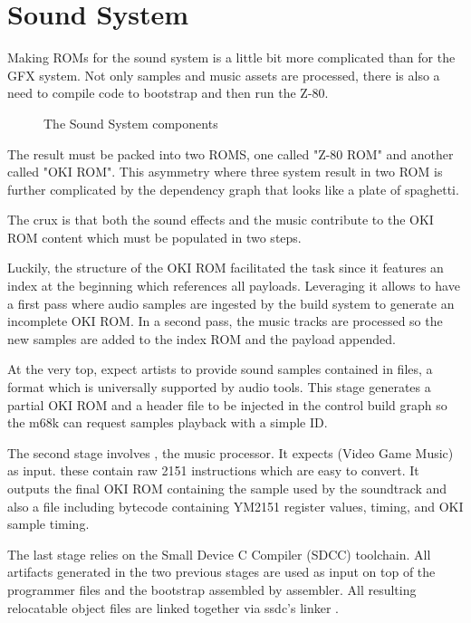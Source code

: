 \chapter{Sound System}
Making ROMs for the sound system is a little bit more complicated than for the GFX system. Not only samples and music assets are processed, there is also a need to compile code to bootstrap and then run the Z-80. 

\begin{figure}[H]
\caption*{The Sound System components}
\end{figure}

The result must be packed into two ROMS, one called "Z-80 ROM" and another called "OKI ROM". This asymmetry where three system result in two ROM is further complicated by the dependency graph that looks like a plate of spaghetti. 

The crux is that both the sound effects and the music contribute to the OKI ROM content which must be populated in two steps.




Luckily, the structure of the OKI ROM facilitated the task since it features an index at the beginning which references all payloads. Leveraging it allows to have a first pass where audio samples are ingested by the build system to generate an incomplete OKI ROM. In a second pass, the music tracks are processed so the new samples are added to the index ROM and the payload appended.

At the very top,  expect artists to provide sound samples contained in  files, a format which is universally supported by audio tools. This stage generates a partial OKI ROM and a  header file to be injected in the control build graph so the m68k can request samples playback with a simple ID.

The second stage involves , the music processor. It expects  (Video Game Music) as input. these contain raw 2151 instructions which are easy to convert. It outputs the final OKI ROM containing the sample used by the soundtrack and also a  file including bytecode containing YM2151 register values, timing, and OKI sample timing.

The last stage relies on the Small Device C Compiler (SDCC) toolchain. All artifacts generated in the two previous stages are used as input on top of the programmer  files and the bootstrap  assembled by  assembler. All resulting relocatable object files  are linked together via ssdc's linker . 


